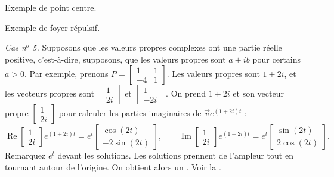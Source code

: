 \begin{myfig}
\parbox[t]{3.0in}{
 \capstart
 \caption{Exemple de point centre.\label{pln:ellipsesfig}}
}
\quad
\parbox[t]{3.0in}{
 \capstart
 \caption{Exemple de foyer répulsif.\label{pln:spiral-sourcefig}}
}
\end{myfig}

\medskip

\emph{Cas n$^o$ 5.} Supposons que les valeurs propres complexes ont une partie réelle positive, c'est-à-dire, supposons, que les valeurs propres sont $a \pm ib$ pour certains $a > 0$.
Par exemple, prenons $P = 
\left[ \begin{smallmatrix} 1 & 1 \\ -4 & 1 \end{smallmatrix} \right]$.
Les valeurs propres sont $1\pm 2i$, et les vecteurs propres sont
$\left[ \begin{smallmatrix} 1 \\ 2i \end{smallmatrix} \right]$ et
$\left[ \begin{smallmatrix} 1 \\ -2i \end{smallmatrix} \right]$. On prend
$1 + 2i$ et son vecteur propre
$\left[ \begin{smallmatrix} 1 \\ 2i \end{smallmatrix} \right]$ pour calculer les parties imaginaires de
$\vec{v} e^{(1+2i)t}$ :
\begin{equation*}
\operatorname{Re}
\begin{bmatrix} 1 \\ 2i \end{bmatrix} e^{(1+2i)t} =
e^t
\begin{bmatrix} \cos (2t) \\ -2 \sin (2t) \end{bmatrix} ,
\qquad
\operatorname{Im}
\begin{bmatrix} 1 \\ 2i \end{bmatrix} e^{(1+2i)t} =
e^t
\begin{bmatrix} \sin (2t) \\ 2 \cos (2t) \end{bmatrix} .
\end{equation*}
Remarquez $e^t$ devant les solutions. Les solutions prennent de l'ampleur tout en tournant autour de l'origine. On obtient alors un \emph{}. Voir la .

